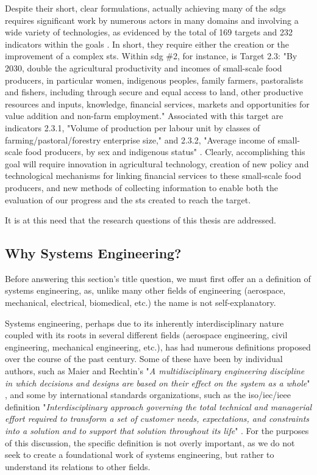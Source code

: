 Despite their short, clear formulations, actually achieving many of the \acp{sdg} requires significant work by numerous actors in many domains and involving a wide variety of technologies, as evidenced by the total of 169 targets and  232 indicators within the goals \cite{unitednationsgeneralassemblyGlobalIndicatorFramework2017}. In short, they require either the creation or the improvement of a complex \ac{sts}. Within \ac{sdg} \#2, for instance, is Target 2.3: "By 2030, double the agricultural productivity and incomes of small-scale food producers, in particular women, indigenous peoples, family farmers, pastoralists and fishers, including through secure and equal access to land, other productive resources and inputs, knowledge, financial services, markets and opportunities for value addition and non-farm employment." Associated with this target are indicators 2.3.1, "Volume of production per labour unit by classes of farming/pastoral/forestry enterprise size," and 2.3.2, "Average income of small-scale food producers, by sex and indigenous status" \cite{unitednationsgeneralassemblyGlobalIndicatorFramework2017}. Clearly, accomplishing this goal will require innovation in agricultural technology, creation of new policy and technological mechanisms for linking financial services to these small-scale food producers, and new methods of collecting information to enable both the evaluation of our progress and the \ac{sts} created to reach the target. 

It is at this need that the research questions of this thesis are addressed.

\subsection{Why Systems Engineering?} \label{sec:se}

Before answering this section's title question, we must first offer an a definition of systems engineering, as, unlike many other fields of engineering (aerospace, mechanical, electrical, biomedical, etc.) the name is not self-explanatory. 

Systems engineering, perhaps due to its inherently interdisciplinary nature coupled with its roots in several different fields (aerospace engineering, civil engineering, mechanical engineering, etc.), has had numerous definitions proposed over the course of the past century. Some of these have been by individual authors, such as Maier and Rechtin's "\textit{A multidisciplinary engineering discipline in which decisions and designs are based on their effect on the system as a whole}" \cite{maierArtSystemsArchitecting2009}, and some by international standards organizations, such as the \ac{iso}/\ac{iec}/\ac{ieee} definition "\textit{Interdisciplinary approach governing the total technical and managerial effort required to transform a set of customer needs, expectations, and constraints into a solution and to support that solution throughout its life}" \cite{internationalorganizationforstandardizationSystemsSoftwareEngineering2010} . For the purposes of this discussion, the specific definition is not overly important, as we do not seek to create a foundational work of systems engineering, but rather to understand its relations to other fields.

